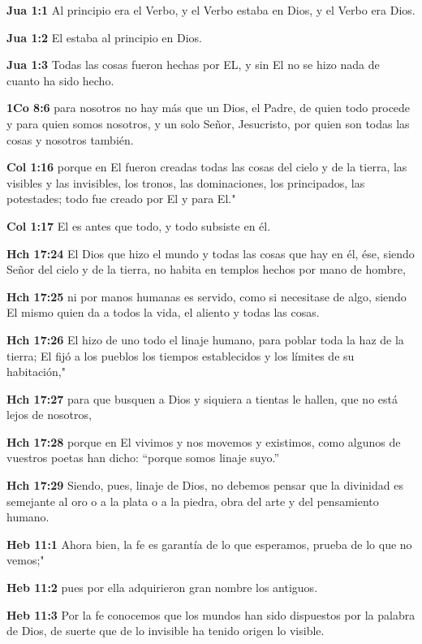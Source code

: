 
\textbf{Jua 1:1} Al principio era el Verbo, y el Verbo estaba en Dios, y el Verbo era Dios. 

\textbf{Jua 1:2} El estaba al principio en Dios. 

\textbf{Jua 1:3} Todas las cosas fueron hechas por EL, y sin El no se hizo nada de cuanto ha sido hecho. 

\textbf{1Co 8:6} para nosotros no hay más que un Dios, el Padre, de quien todo procede y para quien somos nosotros, y un solo Señor, Jesucristo, por quien son todas las cosas y nosotros también. 

\textbf{Col 1:16} porque en El fueron creadas todas las cosas del cielo y de la tierra, las visibles y las invisibles, los tronos, las dominaciones, los principados, las potestades; todo fue creado por El y para El." 

\textbf{Col 1:17} El es antes que todo, y todo subsiste en él. 

\textbf{Hch 17:24} El Dios que hizo el mundo y todas las cosas que hay en él, ése, siendo Señor del cielo y de la tierra, no habita en templos hechos por mano de hombre, 

\textbf{Hch 17:25} ni por manos humanas es servido, como si necesitase de algo, siendo El mismo quien da a todos la vida, el aliento y todas las cosas. 

\textbf{Hch 17:26} El hizo de uno todo el linaje humano, para poblar toda la haz de la tierra; El fijó a los pueblos los tiempos establecidos y los límites de su habitación," 

\textbf{Hch 17:27} para que busquen a Dios y siquiera a tientas le hallen, que no está lejos de nosotros, 

\textbf{Hch 17:28} porque en El vivimos y nos movemos y existimos, como algunos de vuestros poetas han dicho: “porque somos linaje suyo.” 

\textbf{Hch 17:29} Siendo, pues, linaje de Dios, no debemos pensar que la divinidad es semejante al oro o a la plata o a la piedra, obra del arte y del pensamiento humano. 




\textbf{Heb 11:1} Ahora bien, la fe es garantía de lo que esperamos, prueba de lo que no vemos;" 

\textbf{Heb 11:2} pues por ella adquirieron gran nombre los antiguos. 

\textbf{Heb 11:3} Por la fe conocemos que los mundos han sido dispuestos por la palabra de Dios, de suerte que de lo invisible ha tenido origen lo visible. 

